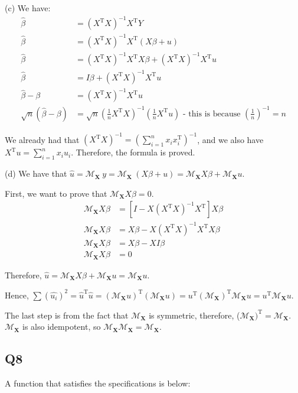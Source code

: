 \documentclass{article}
\newcommand{\X}{\mathbf{X}}
\newcommand{\tp}{^{\mathrm T}}
\begin{document}
(c) We have:
\begin{align*}
    \hat{\beta} & = (X\tp X)^{-1} X\tp Y \\
    \hat{\beta} & = (X\tp X)^{-1} X\tp (X \beta + u) \\
    \hat{\beta} & = (X\tp X)^{-1} X\tp X \beta + (X\tp X)^{-1} X\tp u \\
    \hat{\beta} & = I \beta + (X\tp X)^{-1} X\tp u \\
    \hat{\beta} - \beta & = (X\tp X)^{-1} X\tp u \\
    \sqrt{n} (\hat{\beta} - \beta) & = \sqrt{n} (\frac{1}{n} X\tp X)^{-1} (\frac{1}{n} X\tp u) \text{ - this is because } (\frac{1}{n})^{-1} = n
\end{align*}

We already had that $(X\tp X)^{-1} = (\sum_{i=1}^{n} x_i x_i\tp)^{-1}$, and we also have $X\tp u = \sum_{i=1}^{n} x_i u_i$. Therefore, the formula is proved.

(d) We have that $\hat{u} = \mathcal M_{\X} \ y = \mathcal M_{\X} \ (X\beta + u) = \mathcal M_{\X} X \beta + \mathcal M_{\X} u $.

First, we want to prove that $\mathcal M_{\X} X \beta = 0$.
\begin{align*}
    \mathcal M_{\X} X \beta & = [I - X (X\tp X)^{-1} X\tp] X \beta \\
    \mathcal M_{\X} X \beta & = X \beta - X (X\tp X)^{-1} X\tp X \beta \\
    \mathcal M_{\X} X \beta & = X \beta - X I \beta \\
    \mathcal M_{\X} X \beta & = 0
\end{align*}

Therefore, $\hat{u} = \mathcal M_{\X} X \beta + \mathcal M_{\X} u = \mathcal M_{\X} u $.

Hence, $\sum (\hat{u_i})^2 = \hat{u}\tp \hat{u} = (\mathcal M_{\X} u)\tp (\mathcal M_{\X} u) = u\tp (\mathcal M_{\X})\tp \mathcal M_{\X} u = u\tp \mathcal M_{\X} u $.

The last step is from the fact that $\mathcal M_{\X}$ is symmetric, therefore, ($\mathcal M_{\X})\tp = \mathcal M_{\X}$. $\mathcal M_{\X}$ is also idempotent, so $\mathcal M_{\X} \mathcal M_{\X} = \mathcal M_{\X}$.

\pagebreak
\subsection*{Q8}

A function that satisfies the specifications is below:
\end{document}

